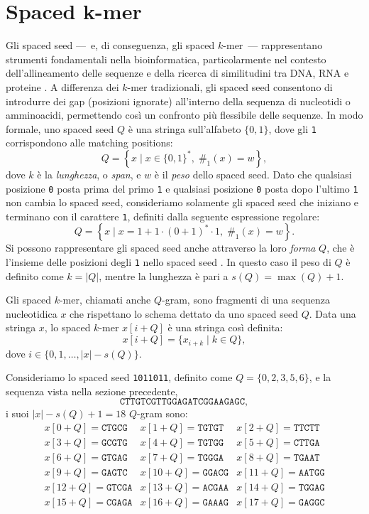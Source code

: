 \section[Spaced $k$-mer]{Spaced k-mer}
\label{sec:spacedkmer}

Gli spaced seed ---~e, di conseguenza, gli spaced $k$-mer~--- rappresentano strumenti fondamentali nella bioinformatica, particolarmente nel contesto dell'allineamento delle sequenze e della ricerca di similitudini tra DNA, RNA e proteine \cite{brinda2015spaced,ounit2016higher,girotto2017theoretical}. A differenza dei $k$-mer tradizionali, gli spaced seed consentono di introdurre dei gap (posizioni ignorate) all'interno della sequenza di nucleotidi o amminoacidi, permettendo così un confronto più flessibile delle sequenze. In modo formale, uno spaced seed $Q$ è una stringa sull'alfabeto $\{0, 1\}$, dove gli \texttt{1} corrispondono alle matching positions: \[ Q = \left\{ x \; | \; x \in \{0, 1\}^*, \; \#_1(x) = w \right\}, \] dove $k$ è la \emph{lunghezza}, o \emph{span}, e $w$ è il \emph{peso} dello spaced seed. Dato che qualsiasi posizione \texttt{0} posta prima del primo \texttt{1} e qualsiasi posizione \texttt{0} posta dopo l'ultimo \texttt{1} non cambia lo spaced seed, consideriamo solamente gli spaced seed che iniziano e terminano con il carattere \texttt{1}, definiti dalla seguente espressione regolare: \[ Q = \left\{ x \; | \; x = 1 + 1 \cdot (0 + 1)^* \cdot 1, \; \#_1(x) = w \right\}. \]
Si possono rappresentare gli spaced seed anche attraverso la loro \emph{forma} $Q$, che è l'insieme delle posizioni degli \texttt{1} nello spaced seed \cite{keich2004spaced}. In questo caso il peso di $Q$ è definito come $k = |Q|$, mentre la lunghezza è pari a $s(Q) = \max(Q) + 1$. 

Gli spaced $k$-mer, chiamati anche $Q$-gram, sono fragmenti di una sequenza nucleotidica $x$ che rispettano lo schema dettato da uno spaced seed $Q$. Data una stringa $x$, lo spaced $k$-mer $x[i + Q]$ è una stringa così definita: \[ x[i + Q] = \{ x_{i + k} \; | \; k \in Q \}, \] dove $i \in \{0, 1, \dots, |x| - s(Q) \}$.

Consideriamo lo spaced seed \texttt{1011011}, definito come $Q = \{ 0, 2, 3, 5, 6 \}$, e la sequenza vista nella sezione precedente, \[ \texttt{CTTGTCGTTGGAGATCGGAAGAGC}, \] i suoi $|x| - s(Q) + 1 = 18$ $Q$-gram sono: \[ \begin{matrix}
	x[0 + Q] = \texttt{CTGCG} & x[1 + Q] = \texttt{TGTGT} & x[2 + Q] = \texttt{TTCTT} \\
	x[3 + Q] = \texttt{GCGTG} & x[4 + Q] = \texttt{TGTGG} & x[5 + Q] = \texttt{CTTGA} \\
	x[6 + Q] = \texttt{GTGAG} & x[7 + Q] = \texttt{TGGGA} & x[8 + Q] = \texttt{TGAAT} \\
	x[9 + Q] = \texttt{GAGTC} & x[10 + Q] = \texttt{GGACG} & x[11 + Q] = \texttt{AATGG} \\
	x[12 + Q] = \texttt{GTCGA} & x[13 + Q] = \texttt{ACGAA} & x[14 + Q] = \texttt{TGGAG} \\
	x[15 + Q] = \texttt{CGAGA} & x[16 + Q] = \texttt{GAAAG} & x[17 + Q] = \texttt{GAGGC} \\
\end{matrix} \]

